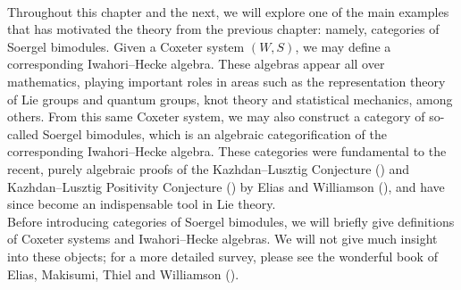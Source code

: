 \noindent\\ Throughout this chapter and the next, we will explore one of the main examples that has motivated the theory from the previous chapter: namely, categories of Soergel bimodules. %
Given a Coxeter system $(W, S)$, we may define a corresponding Iwahori--Hecke algebra. These algebras appear all over mathematics, playing important roles in areas such as the representation theory of Lie groups and quantum groups, knot theory and statistical mechanics, among others. From this same Coxeter system, we may also construct a category of so-called Soergel bimodules, which is an algebraic categorification of the corresponding Iwahori--Hecke algebra. These categories were fundamental to the recent, purely algebraic proofs of the Kazhdan--Lusztig Conjecture (\cite[Conjecture 1.5]{KL79}) and Kazhdan--Lusztig Positivity Conjecture (\cite[p.\ 166]{KL79}) by Elias and Williamson (\cite[Theorem 1.1 and Corollary 1.2, respectively]{EW14}), and have since become an indispensable tool in Lie theory.\\

\noindent Before introducing categories of Soergel bimodules, we will briefly give definitions of Coxeter systems and Iwahori--Hecke algebras. We will not give much insight into these objects; for a more detailed survey, please see the wonderful book of Elias, Makisumi, Thiel and Williamson (\cite{EMTW20}).\\

